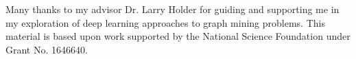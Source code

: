 \documentclass[12pt]{WSUThesis}
\theoremstyle{definition}
\begin{document}
\DisplayTitlePage     %
\DisplayCopyright     %
\DisplaySignaturePage %
\begin{acknowledgments}
	
	Many thanks to my advisor Dr. Larry Holder for guiding and supporting me in my exploration of deep learning approaches to graph mining problems.
	This material is based upon work supported by the National Science Foundation under Grant No. 1646640.
	
\end{acknowledgments}
\end{document}
